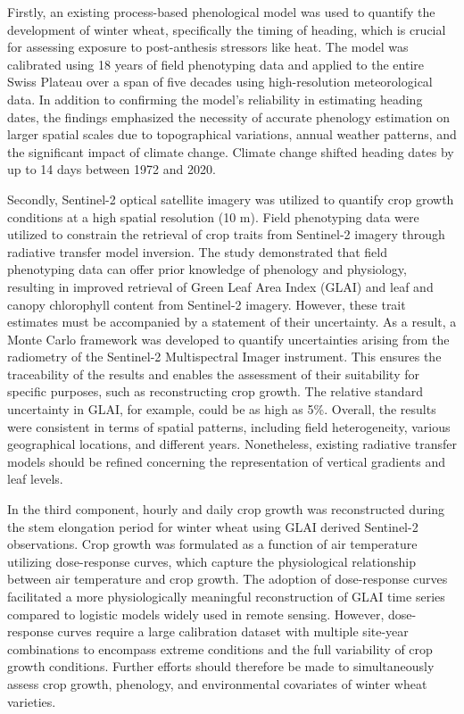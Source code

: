 Firstly, an existing process-based phenological model was used to quantify the development of winter wheat, specifically the timing of heading, which is crucial for assessing exposure to post-anthesis stressors like heat. The model was calibrated using 18 years of field phenotyping data and applied to the entire Swiss Plateau over a span of five decades using high-resolution meteorological data. In addition to confirming the model's reliability in estimating heading dates, the findings emphasized the necessity of accurate phenology estimation on larger spatial scales due to topographical variations, annual weather patterns, and the significant impact of climate change. Climate change shifted heading dates by up to 14 days between 1972 and 2020.

Secondly, Sentinel-2 optical satellite imagery was utilized to quantify crop growth conditions at a high spatial resolution (10 m). Field phenotyping data were utilized to constrain the retrieval of crop traits from Sentinel-2 imagery through radiative transfer model inversion. The study demonstrated that field phenotyping data can offer prior knowledge of phenology and physiology, resulting in improved retrieval of Green Leaf Area Index (GLAI) and leaf and canopy chlorophyll content from Sentinel-2 imagery. However, these trait estimates must be accompanied by a statement of their uncertainty. As a result, a Monte Carlo framework was developed to quantify uncertainties arising from the radiometry of the Sentinel-2 Multispectral Imager instrument. This ensures the traceability of the results and enables the assessment of their suitability for specific purposes, such as reconstructing crop growth. The relative standard uncertainty in GLAI, for example, could be as high as 5\%. Overall, the results were consistent in terms of spatial patterns, including field heterogeneity, various geographical locations, and different years. Nonetheless, existing radiative transfer models should be refined concerning the representation of vertical gradients and leaf levels.

In the third component, hourly and daily crop growth was reconstructed during the stem elongation period for winter wheat using GLAI derived Sentinel-2 observations. Crop growth was formulated as a function of air temperature utilizing dose-response curves, which capture the physiological relationship between air temperature and crop growth. The adoption of dose-response curves facilitated a more physiologically meaningful reconstruction of GLAI time series compared to logistic models widely used in remote sensing. However, dose-response curves require a large calibration dataset with multiple site-year combinations to encompass extreme conditions and the full variability of crop growth conditions. Further efforts should therefore be made to simultaneously assess crop growth, phenology, and environmental covariates of winter wheat varieties. 

